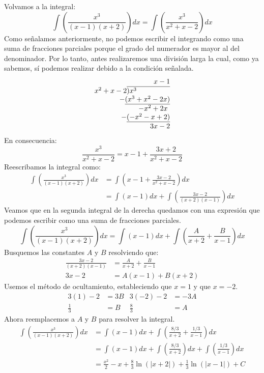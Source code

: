 \documentclass[12pt]{article}
\begin{document}
Volvamos a la integral:
\[
  \int \left(\frac{x^{3}}{(x - 1)(x + 2)}\right) dx = \int \left(\frac{x^{3}}{x^{2} + x - 2}\right) dx
\]
Como señalamos anteriormente, no podemos escribir el integrando como una suma de fracciones parciales porque el grado del numerador es mayor al del denominador. Por lo tanto, antes realizaremos una división larga la cual, como ya sabemos, sí podemos realizar debido a la condición señalada.
\[
\begin{array}{r}
x - 1 \\
x^{2} + x - 2 \overline{\smash{)} x^{3} \text{ } \text{ } \text{ } \text{ } \text{ } \text{ } \text{ }\text{ }\text{ }\text{ }\text{ }\text{ } \text{ }\text{ }} \\
- \underline{(x^{3} + x^{2} - 2x)} \\
- x^{2} + 2x \text{ } \\
- \underline{(-x^{2} - x + 2)} \\
3x - 2
\end{array}
\]
En consecuencia:
\[
  \frac{x^{3}}{x^{2} + x - 2} = x - 1 + \frac{3x + 2}{x^{2} + x - 2}
\]
Reescribamos la integral como:
\begin{align*}
  \int \left(\frac{x^{3}}{(x - 1)(x + 2)}\right) dx &= \int \left(x - 1 + \frac{3x - 2}{x^{2} + x - 2}\right) dx \\
                                                    &= \int (x - 1)dx + \int \left(\frac{3x - 2}{(x + 2)(x - 1)}\right) dx
\end{align*}
Veamos que en la segunda integral de la derecha quedamos con una expresión que podemos escribir como una suma de fracciones parciales.
\[
  \int \left(\frac{x^{3}}{(x - 1)(x + 2)}\right) dx = \int (x - 1)dx + \int \left(\frac{A}{x + 2} + \frac{B}{x - 1}\right) dx
\]
Busquemos las constantes $A$ y $B$ resolviendo que:
\begin{align*}
  \frac{3x - 2}{(x + 2)(x - 1)} &= \frac{A}{x + 2} + \frac{B}{x - 1} \\
                         3x - 2 &= A(x - 1) + B(x + 2)
\end{align*}
Usemos el método de ocultamiento, estableciendo que $x = 1$ y que $x = -2$.
\begin{align*}
3(1) - 2 &= 3B & 3(-2) - 2 &= -3A \\
\frac{1}{3} &= B & \frac{8}{3} &= A
\end{align*}
Ahora reemplacemos a $A$ y $B$ para resolver la integral.
\begin{align*}
  \int \left(\frac{x^{3}}{(x - 1)(x + 2)}\right) dx &= \int (x - 1)dx + \int \left(\frac{8/3}{x + 2} + \frac{1/3}{x - 1}\right) dx \\
                                                    &= \int (x - 1) dx + \int \left(\frac{8/3}{x + 2}\right) dx + \int \left(\frac{1/3}{x - 1}\right) dx \\
                                                    &= \frac{x^{2}}{2} - x + \frac{8}{3} \ln(|x + 2|) + \frac{1}{3} \ln(|x - 1|) + C
\end{align*}
\end{document}
